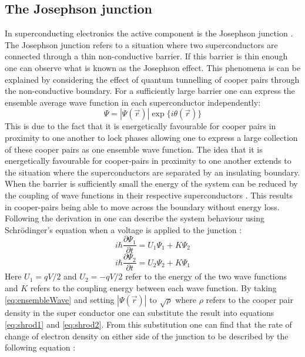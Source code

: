 \subsection{The Josephson junction}
In superconducting electronics the active component is the Josephson junction \cite{Duzer_1999_Princip_Super}. The Josephson junction refers to a situation where two superconductors are connected through a thin non-conductive barrier. If this barrier is thin enough one can observe what is known as the Josephson effect. This phenomena is can be explained by considering the effect of quantum tunnelling of cooper pairs through the non-conductive boundary. For a sufficiently large barrier one can express the ensemble average wave function in each superconductor independently\cite{Duzer_1999_Princip_Super}:
\begin{equation}
    \Psi = |\Psi(\Vec{r})| \exp{\{i\theta(\Vec{r})\}}
    \label{eq:ensembleWave}
\end{equation}
This is due to the fact that it is energetically favourable for cooper pairs in proximity to one another to lock phases \cite{Duzer_1999_Princip_Super} allowing one to express a large collection of these cooper pairs as one ensemble wave function. The idea that it is energetically favourable for cooper-pairs in proximity to one another extends to the situation where the superconductors are separated by an insulating boundary. When the barrier is sufficiently small the energy of the system can be reduced by the coupling of wave functions in their respective superconductors \cite{Duzer_1999_Princip_Super}. This results in cooper-pairs being able to move across the boundary without energy loss. Following the derivation in \cite{Feynman_Leighton_Sands_2013} one can describe the system behaviour using Schrödinger's equation when a voltage is applied to the junction \cite{Feynman_Leighton_Sands_2013}: 
\begin{equation}
    i\hbar \frac{\partial\Psi_1}{\partial t} = U_1\Psi_1 +K\Psi_2 
    \label{eq:shrod1}
\end{equation}
\begin{equation}
    i\hbar \frac{\partial\Psi_2}{\partial t} = U_2\Psi_2 +K\Psi_1
    \label{eq:shrod2}
\end{equation}
Here $U_1 = qV/2$ and $U_2 = -qV/2$ \cite{Feynman_Leighton_Sands_2013} refer to the energy of the two wave functions and $K$ refers to the coupling energy between each wave function. By taking \ref{eq:ensembleWave} and setting $|\Psi(\Vec{r})|$ to $\sqrt{\rho}$ where $\rho$ refers to the cooper pair density in the super conductor one can substitute the result into equations \ref{eq:shrod1} and \ref{eq:shrod2}. From this substitution one can find that the rate of change of electron density on either side of the junction to be described by the following equation \cite{Feynman_Leighton_Sands_2013}:


